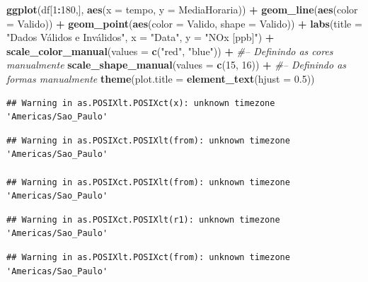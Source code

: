 \documentclass[]{book}
\newenvironment{Shaded}{\begin{snugshade}}{\end{snugshade}}
\newcommand{\KeywordTok}[1]{\textcolor[rgb]{0.13,0.29,0.53}{\textbf{#1}}}
\newcommand{\DataTypeTok}[1]{\textcolor[rgb]{0.13,0.29,0.53}{#1}}
\newcommand{\DecValTok}[1]{\textcolor[rgb]{0.00,0.00,0.81}{#1}}
\newcommand{\FloatTok}[1]{\textcolor[rgb]{0.00,0.00,0.81}{#1}}
\newcommand{\StringTok}[1]{\textcolor[rgb]{0.31,0.60,0.02}{#1}}
\newcommand{\CommentTok}[1]{\textcolor[rgb]{0.56,0.35,0.01}{\textit{#1}}}
\newcommand{\OperatorTok}[1]{\textcolor[rgb]{0.81,0.36,0.00}{\textbf{#1}}}
\newcommand{\NormalTok}[1]{#1}
\theoremstyle{definition}
\theoremstyle{definition}
\theoremstyle{definition}
\theoremstyle{remark}
\begin{document}
\begin{Shaded}
\begin{Highlighting}[]
\KeywordTok{ggplot}\NormalTok{(df[}\DecValTok{1}\OperatorTok{:}\DecValTok{180}\NormalTok{,], }\KeywordTok{aes}\NormalTok{(}\DataTypeTok{x =}\NormalTok{ tempo, }\DataTypeTok{y =}\NormalTok{ MediaHoraria)) }\OperatorTok{+}\StringTok{ }
\StringTok{  }\KeywordTok{geom_line}\NormalTok{(}\KeywordTok{aes}\NormalTok{(}\DataTypeTok{color =}\NormalTok{ Valido)) }\OperatorTok{+}
\StringTok{  }\KeywordTok{geom_point}\NormalTok{(}\KeywordTok{aes}\NormalTok{(}\DataTypeTok{color =}\NormalTok{ Valido, }\DataTypeTok{shape =}\NormalTok{ Valido)) }\OperatorTok{+}
\StringTok{  }\KeywordTok{labs}\NormalTok{(}\DataTypeTok{title =} \StringTok{"Dados Válidos e Inválidos"}\NormalTok{, }\DataTypeTok{x =} \StringTok{"Data"}\NormalTok{, }\DataTypeTok{y =} \StringTok{"NOx [ppb]"}\NormalTok{) }\OperatorTok{+}
\StringTok{  }\KeywordTok{scale_color_manual}\NormalTok{(}\DataTypeTok{values =} \KeywordTok{c}\NormalTok{(}\StringTok{"red"}\NormalTok{, }\StringTok{"blue"}\NormalTok{)) }\OperatorTok{+}\StringTok{ }\CommentTok{#-- Definindo as cores manualmente}
\StringTok{  }\KeywordTok{scale_shape_manual}\NormalTok{(}\DataTypeTok{values =} \KeywordTok{c}\NormalTok{(}\DecValTok{15}\NormalTok{, }\DecValTok{16}\NormalTok{)) }\OperatorTok{+}\StringTok{ }\CommentTok{#-- Definindo as formas manualmente}
\StringTok{  }\KeywordTok{theme}\NormalTok{(}\DataTypeTok{plot.title =} \KeywordTok{element_text}\NormalTok{(}\DataTypeTok{hjust =} \FloatTok{0.5}\NormalTok{))}
\end{Highlighting}
\end{Shaded}

\begin{verbatim}
## Warning in as.POSIXlt.POSIXct(x): unknown timezone 'Americas/Sao_Paulo'
\end{verbatim}

\begin{verbatim}
## Warning in as.POSIXct.POSIXlt(from): unknown timezone 'Americas/Sao_Paulo'

## Warning in as.POSIXct.POSIXlt(from): unknown timezone 'Americas/Sao_Paulo'
\end{verbatim}

\begin{verbatim}
## Warning in as.POSIXct.POSIXlt(r1): unknown timezone 'Americas/Sao_Paulo'
\end{verbatim}

\begin{verbatim}
## Warning in as.POSIXlt.POSIXct(from): unknown timezone 'Americas/Sao_Paulo'
\end{verbatim}
\end{document}

